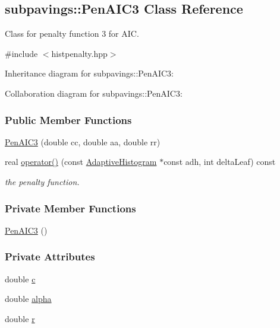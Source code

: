 \hypertarget{classsubpavings_1_1PenAIC3}{\subsection{subpavings\-:\-:\-Pen\-A\-I\-C3 \-Class \-Reference}
\label{classsubpavings_1_1PenAIC3}
}


\-Class for penalty function 3 for \-A\-I\-C.  




{\ttfamily \#include $<$histpenalty.\-hpp$>$}



\-Inheritance diagram for subpavings\-:\-:\-Pen\-A\-I\-C3\-:


\-Collaboration diagram for subpavings\-:\-:\-Pen\-A\-I\-C3\-:
\subsubsection*{\-Public \-Member \-Functions}
\begin{DoxyCompactItemize}
\item 
\hyperlink{classsubpavings_1_1PenAIC3_acb7df9b142cb25ac50c8ab6129e55ddc}{\-Pen\-A\-I\-C3} (double cc, double aa, double rr)
\item 
real \hyperlink{classsubpavings_1_1PenAIC3_ae78d7d10ecb8061fd42dbda9bcccb2d4}{operator()} (const \hyperlink{classsubpavings_1_1AdaptiveHistogram}{\-Adaptive\-Histogram} $\ast$const adh, int delta\-Leaf) const 
\begin{DoxyCompactList}\small\item\em the penalty function. \end{DoxyCompactList}\end{DoxyCompactItemize}
\subsubsection*{\-Private \-Member \-Functions}
\begin{DoxyCompactItemize}
\item 
\hyperlink{classsubpavings_1_1PenAIC3_a129e1d8bfd430e897e81e7a8f76a5d1c}{\-Pen\-A\-I\-C3} ()
\end{DoxyCompactItemize}
\subsubsection*{\-Private \-Attributes}
\begin{DoxyCompactItemize}
\item 
double \hyperlink{classsubpavings_1_1PenAIC3_af838fbd8465a2144500c43058c28480d}{c}
\item 
double \hyperlink{classsubpavings_1_1PenAIC3_a9a8e54711e178d6fb7c632311739fba7}{alpha}
\item 
double \hyperlink{classsubpavings_1_1PenAIC3_a39aa74f535a40c4f4611e8fb44d07a96}{r}
\end{DoxyCompactItemize}


